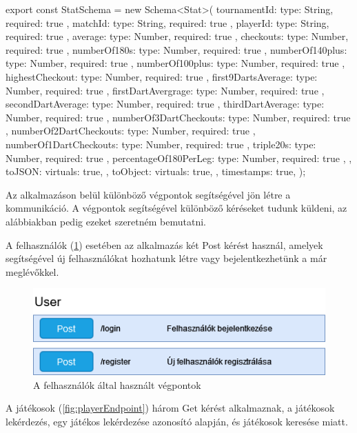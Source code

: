 \begin{cpp}
export const StatSchema = new Schema<Stat>(
  {
    tournamentId: { type: String, required: true },
    matchId: { type: String, required: true },
    playerId: { type: String, required: true },
    average: { type: Number, required: true },
    checkouts: { type: Number, required: true },
    numberOf180s: { type: Number, required: true },
    numberOf140plus: { type: Number, required: true },
    numberOf100plus: { type: Number, required: true },
    highestCheckout: { type: Number, required: true },
    first9DartsAverage: { type: Number, required: true },
    firstDartAvergrage: { type: Number, required: true },
    secondDartAverage: { type: Number, required: true },
    thirdDartAverage: { type: Number, required: true },
    numberOf3DartCheckouts: { type: Number, required: true },
    numberOf2DartCheckouts: { type: Number, required: true },
    numberOf1DartCheckouts: { type: Number, required: true },
    triple20s: { type: Number, required: true },
    percentageOf180PerLeg: { type: Number, required: true },
  },
  {
    toJSON: {
      virtuals: true,
    },
    toObject: {
      virtuals: true,
    },
    timestamps: true,
  }
);
\end{cpp}

Az alkalmazáson belül különböző végpontok segítségével jön létre a kommunikáció. A végpontok segítségével különböző kéréseket tudunk küldeni, az alábbiakban pedig ezeket szeretném bemutatni.

A felhasználók (\ref{fig:userEndpoint}) esetében az alkalmazás két Post kérést használ, amelyek segítségével új felhasználókat hozhatunk létre vagy bejelentkezhetünk a már meglévőkkel.

\begin{figure}[h]
\centering
\includegraphics[scale=0.4]{images/User_Vegpontok.drawio.png}
\caption{A felhasználók által használt végpontok}
\label{fig:userEndpoint}
\end{figure}

A játékosok (\ref{fig:playerEndpoint}) három Get kérést alkalmaznak, a játékosok lekérdezés, egy játékos lekérdezése azonosító alapján, és játékosok keresése miatt.

